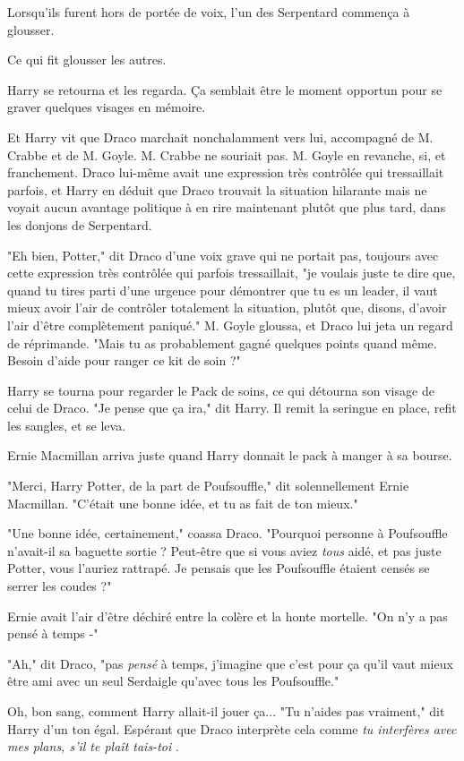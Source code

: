 Lorsqu'ils furent hors de portée de voix, l'un des Serpentard commença à glousser.

Ce qui fit glousser les autres.

Harry se retourna et les regarda. Ça semblait être le moment opportun pour se graver quelques visages en mémoire.

Et Harry vit que Draco marchait nonchalamment vers lui, accompagné de M. Crabbe et de M. Goyle. M. Crabbe ne souriait pas. M. Goyle en revanche, si, et franchement. Draco lui-même avait une expression très contrôlée qui tressaillait parfois, et Harry en déduit que Draco trouvait la situation hilarante mais ne voyait aucun avantage politique à en rire maintenant plutôt que plus tard, dans les donjons de Serpentard.

"Eh bien, Potter," dit Draco d'une voix grave qui ne portait pas, toujours avec cette expression très contrôlée qui parfois tressaillait, "je voulais juste te dire que, quand tu tires parti d'une urgence pour démontrer que tu es un leader, il vaut mieux avoir l'air de contrôler totalement la situation, plutôt que, disons, d'avoir l'air d'être complètement paniqué." M. Goyle gloussa, et Draco lui jeta un regard de réprimande. "Mais tu as probablement gagné quelques points quand même. Besoin d'aide pour ranger ce kit de soin ?"

Harry se tourna pour regarder le Pack de soins, ce qui détourna son visage de celui de Draco. "Je pense que ça ira," dit Harry. Il remit la seringue en place, refit les sangles, et se leva.

Ernie Macmillan arriva juste quand Harry donnait le pack à manger à sa bourse.

"Merci, Harry Potter, de la part de Poufsouffle," dit solennellement Ernie Macmillan. "C'était une bonne idée, et tu as fait de ton mieux."

"Une bonne idée, certainement," coassa Draco. "Pourquoi personne à Poufsouffle n'avait-il sa baguette sortie ? Peut-être que si vous aviez \emph{tous}  aidé, et pas juste Potter, vous l'auriez rattrapé. Je pensais que les Poufsouffle étaient censés se serrer les coudes ?"

Ernie avait l'air d'être déchiré entre la colère et la honte mortelle. "On n'y a pas pensé à temps -"

"Ah," dit Draco, "pas \emph{pensé}  à temps, j'imagine que c'est pour ça qu'il vaut mieux être ami avec un seul Serdaigle qu'avec tous les Poufsouffle."

Oh, bon sang, comment Harry allait-il jouer ça... "Tu n'aides pas vraiment," dit Harry d'un ton égal. Espérant que Draco interprète cela comme \emph{tu interfères avec mes plans, s'il te plaît tais-toi} .


